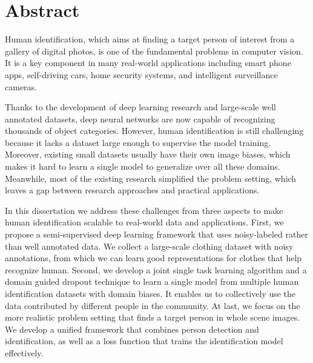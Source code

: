 \chapter*{Abstract}

Human identification, which aims at finding a target person of interest from a gallery of digital photos, is one of the fundamental problems in computer vision. It is a key component in many real-world applications including smart phone apps, self-driving cars, home security systems, and intelligent surveillance cameras.

Thanks to the development of deep learning research and large-scale well annotated datasets, deep neural networks are now capable of recognizing thousands of object categories. However, human identification is still challenging because it lacks a dataset large enough to supervise the model training. Moreover, existing small datasets usually have their own image biases, which makes it hard to learn a single model to generalize over all these domains. Meanwhile, most of the existing research simplified the problem setting, which leaves a gap between research approaches and practical applications.

In this dissertation we address these challenges from three aspects to make human identification scalable to real-world data and applications. First, we propose a semi-supervised deep learning framework that uses noisy-labeled rather than well annotated data. We collect a large-scale clothing dataset with noisy annotations, from which we can learn good representations for clothes that help recognize human. Second, we develop a joint single task learning algorithm and a domain guided dropout technique to learn a single model from multiple human identification datasets with domain biases. It enables us to collectively use the data contributed by different people in the community. At last, we focus on the more realistic problem setting that finds a target person in whole scene images. We develop a unified framework that combines person detection and identification, as well as a loss function that trains the identification model effectively.